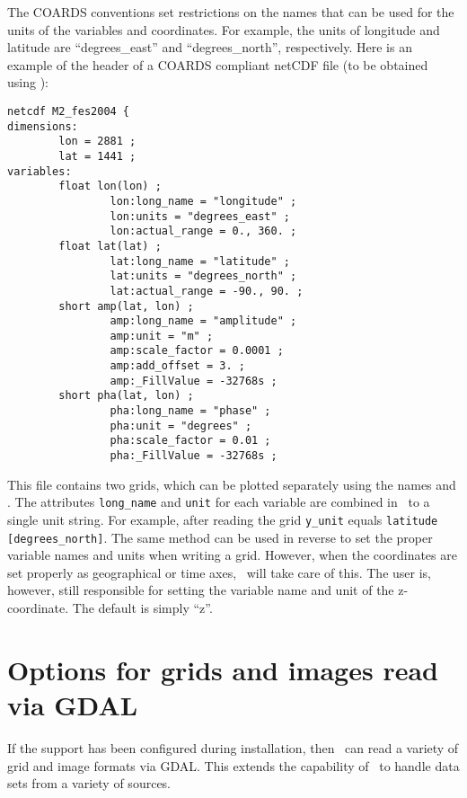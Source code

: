 The COARDS conventions set restrictions on the names that can be used for the units of the variables
and coordinates. For example, the units of longitude and latitude are ``degrees\_east'' and ``degrees\_north'',
respectively. Here is an example of the header of a COARDS compliant netCDF file (to be obtained using
):
\begin{verbatim}
netcdf M2_fes2004 {
dimensions:
        lon = 2881 ;
        lat = 1441 ;
variables:
        float lon(lon) ;
                lon:long_name = "longitude" ;
                lon:units = "degrees_east" ;
                lon:actual_range = 0., 360. ;
        float lat(lat) ;
                lat:long_name = "latitude" ;
                lat:units = "degrees_north" ;
                lat:actual_range = -90., 90. ;
        short amp(lat, lon) ;
                amp:long_name = "amplitude" ;
                amp:unit = "m" ;
                amp:scale_factor = 0.0001 ;
                amp:add_offset = 3. ;
                amp:_FillValue = -32768s ;
        short pha(lat, lon) ;
                pha:long_name = "phase" ;
                pha:unit = "degrees" ;
                pha:scale_factor = 0.01 ;
                pha:_FillValue = -32768s ;
\end{verbatim}
This file contains two grids, which can be plotted separately using the names 
and . The attributes \verb|long_name| and \verb|unit| for each variable are
combined in \GMT\ to a single unit string. For example, after reading the grid \verb|y_unit| equals
\verb|latitude [degrees_north]|. The same method can be used in reverse to set the proper variable names
and units when writing a grid. However, when the coordinates are set properly as geographical or time axes,
\GMT\ will take care of this. The user is, however, still responsible for setting the variable name and
unit of the z-coordinate. The default is simply ``z''.


\section{Options for grids and images read via GDAL}
\label{sec:GDAL}

If the support has been configured during installation, then \GMT\ can read a variety
of grid and image formats via GDAL. This extends the capability of \GMT\ to handle
data sets from a variety of sources.

